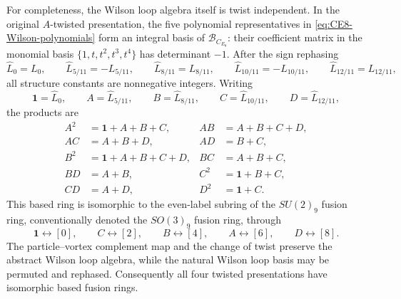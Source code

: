 \documentclass[11pt,a4paper]{article}
\numberwithin{equation}{section}
\begin{document}
For completeness, the Wilson loop algebra itself is twist independent.  In the original $A$-twisted presentation, the five polynomial representatives in \eqref{eq:CE8-Wilson-polynomials} form an integral basis of $\mathcal B_{C_{E_8}}$: their coefficient matrix in the monomial basis $\{1,t,t^2,t^3,t^4\}$ has determinant $-1$.  After the sign rephasing
\begin{equation}
  \widehat L_0=L_0,
  \qquad
  \widehat L_{5/11}=-L_{5/11},
  \qquad
  \widehat L_{8/11}=L_{8/11},
  \qquad
  \widehat L_{10/11}=-L_{10/11},
  \qquad
  \widehat L_{12/11}=L_{12/11},
  \label{eq:based-line-sign-choice}
\end{equation}
all structure constants are nonnegative integers.  Writing
\begin{equation}
  \mathbf1=\widehat L_0,
  \qquad
  A=\widehat L_{5/11},
  \qquad
  B=\widehat L_{8/11},
  \qquad
  C=\widehat L_{10/11},
  \qquad
  D=\widehat L_{12/11},
\end{equation}
the products are
\begin{align}
  A^2&=\mathbf1+A+B+C,
  &AB&=A+B+C+D,
  \nonumber\\
  AC&=A+B+D,
  &AD&=B+C,
  \nonumber\\
  B^2&=\mathbf1+A+B+C+D,
  &BC&=A+B+C,
  \nonumber\\
  BD&=A+B,
  &C^2&=\mathbf1+B+C,
  \nonumber\\
  CD&=A+D,
  &D^2&=\mathbf1+C.
  \label{eq:based-fusion-rules}
\end{align}
This based ring is isomorphic to the even-label subring of the $SU(2)_9$ fusion ring, conventionally denoted the $SO(3)_9$ fusion ring, through
\begin{equation}
  \mathbf1\leftrightarrow[0],
  \qquad
  C\leftrightarrow[2],
  \qquad
  B\leftrightarrow[4],
  \qquad
  A\leftrightarrow[6],
  \qquad
  D\leftrightarrow[8].
  \label{eq:SO39-based-ring-identification}
\end{equation}
The particle--vortex complement map and the change of twist preserve the abstract Wilson loop algebra, while the natural Wilson loop basis may be permuted and rephased.  Consequently all four twisted presentations have isomorphic based fusion rings.
\end{document}
